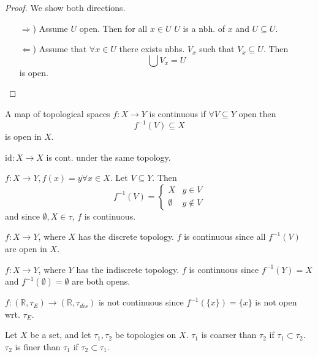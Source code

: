 \begin{proof} We show both directions.
  \begin{enumerate}
    \item[\( \Rightarrow \))] Assume \( U \) open. Then for all \( x \in U \)
      \( U \) is a nbh. of \( x \) and \( U \subseteq U \).
    \item[\( \Leftarrow \))] Assume that \( \forall x \in U \) there exists
      nbhs. \( V_x \) such that \( V_x \subseteq U \). Then
      \[
        \bigcup V_x = U
      \]
      is open.
  \end{enumerate}
\end{proof}

\begin{definition}[Continuity]
   A map of topological spaces \( f: X \to Y \)
   is continuous if \( \forall V \subseteq Y\) open
   then
   \[
    {f}^{-1} (V) \subseteq X
   \]
   is open in \( X \).
\end{definition}

\begin{example}
  \( \text{id}: X \to X \) is cont. under the same topology.
\end{example}

\begin{example}
    \( f:X \to Y, f(x) = y \forall x \in X \).
    Let \( V \subseteq Y \). Then
    \[
      {f}^{-1} (V) = \begin{cases}
        X & y \in V \\
        \emptyset & y \notin V
      \end{cases}
    \]
    and since \( \emptyset, X \in \tau \), \( f \) is continuous.
\end{example}

\begin{example}
    \( f: X \to Y \), where \( X \) has the discrete topology.
    \( f \) is continuous since all \( {f}^{-1} (V) \) are open in \( X \).
\end{example}

\begin{example}
    \( f: X \to Y \), where \( Y \) has the indiscrete topology.
    \( f \) is continuous since \( {f}^{-1} (Y) = X \) and \( {f}^{-1} (\emptyset) = \emptyset \)
    are both opens.
\end{example}

\begin{nonexample}
  \( f:(\mathbb{R}, \tau_E) \to (\mathbb{R}, \tau_{dis}) \) is not continuous
  since \( {f}^{-1} (\{x\}) = \{x\} \) is not open wrt. \( \tau_E \).
\end{nonexample}

\begin{definition}
  Let \( X \) be a set, and let \( \tau_1, \tau_2 \)
  be topologies on \( X \).
  \( \tau_1 \) is coarser than \( \tau_2 \) if \( \tau_1 \subset \tau_2  \).
  \( \tau_2 \) is finer than \( \tau_1 \) if \( \tau_2 \subset \tau_1  \).
\end{definition}
